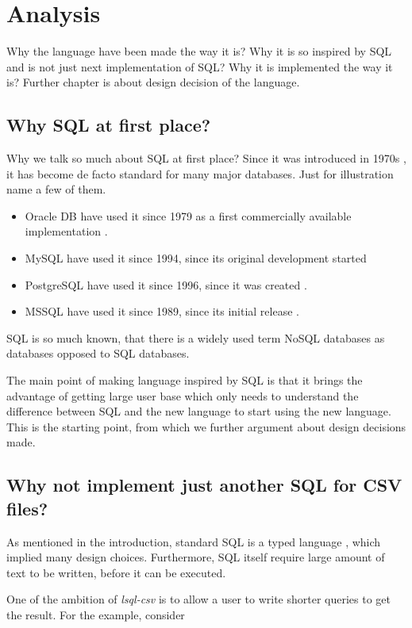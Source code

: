 \chapter{Analysis}
Why the language have been made the way it is? Why it is so inspired by SQL and is not just next implementation of SQL?
Why it is implemented the way it is?
Further chapter is about design decision of the language.


\section{Why SQL at first place?}
Why we talk so much about SQL at first place? Since it was introduced in 1970s \cite{enwiki-sql}, it has
become de facto standard for many major databases. Just for illustration name a few of them.
\begin{itemize}
    \item Oracle DB have used it since 1979 as a first commercially available implementation \cite{oracle-db-sql}. 
    \item MySQL have used it since 1994, since its original development started \cite{enwiki-mysql} 
    \item PostgreSQL have used it since 1996, since it was created \cite{postgres-birthday}. 
    \item MSSQL have used it since 1989, since its initial release \cite{enwiki-mssql}. 
\end{itemize}

SQL is so much known, that there is a widely used term NoSQL databases as databases opposed to SQL databases.

The main point of making language inspired by SQL is that it brings the advantage of getting large user base which only needs to understand the difference between SQL and the new language to start using the new language. This is the starting point, from which we further argument about design decisions made.


\section{Why not implement just another SQL for CSV files?}
As mentioned in the introduction, standard SQL is a typed language \cite{ISO9075-1987}, 
which implied many design choices. Furthermore, SQL itself require large amount of text to be written,
before it can be executed. 

One of the ambition of \textit{lsql-csv} is to allow a user to write shorter queries to get the result. For the example,
consider

